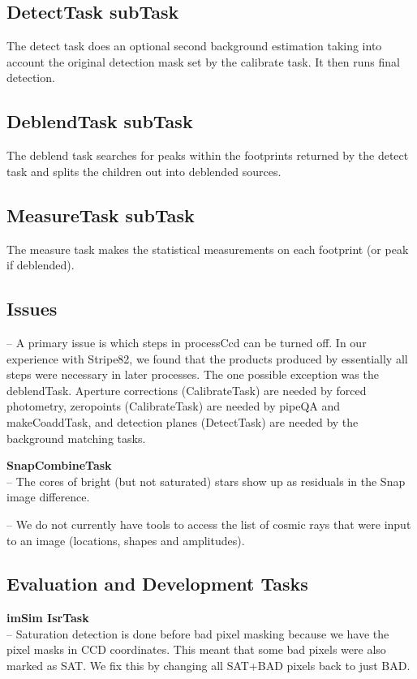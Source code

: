 \documentclass[12pt]{article}
\begin{document}
\subsection{DetectTask subTask}
The detect task does an optional second background estimation taking into account the original detection mask set by the calibrate task.
It then runs final detection.

\subsection{DeblendTask subTask}
The deblend task searches for peaks within the footprints returned by the detect task and splits the children out into deblended sources.

\subsection{MeasureTask subTask}
The measure task makes the statistical measurements on each footprint (or peak if deblended).

\subsection{Issues}
-- A primary issue is which steps in processCcd can be turned off.  In our experience with Stripe82, we found that the products produced by
essentially all steps were necessary in later processes.  The one possible exception was the deblendTask.  Aperture corrections (CalibrateTask) 
are needed by forced photometry, zeropoints (CalibrateTask)
are needed by pipeQA and makeCoaddTask, and detection planes (DetectTask) are needed by the background matching tasks.


{\bf SnapCombineTask}\\
-- The cores of bright (but not saturated) stars show up as residuals
in the Snap image difference.

-- We do not currently have tools to access the list of cosmic rays
that were input to an image (locations, shapes and amplitudes).

\subsection{Evaluation and Development Tasks}
{\bf imSim IsrTask}\\
-- Saturation detection is done before bad pixel masking because we have the pixel masks in CCD coordinates.
This meant that some bad pixels were also marked as SAT.  We fix this by changing all SAT+BAD pixels back to just BAD.
\end{document}
